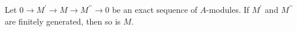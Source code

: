 \begin{exercise}
Let \(0 \to M^\prime \to M \to M^{\prime\prime} \to 0\) be an exact sequence of \(A\)-modules.
If \(M^\prime\) and \(M^{\prime\prime}\) are finitely generated, then so is \(M\).
\end{exercise}

\begin{solution}

\end{solution}